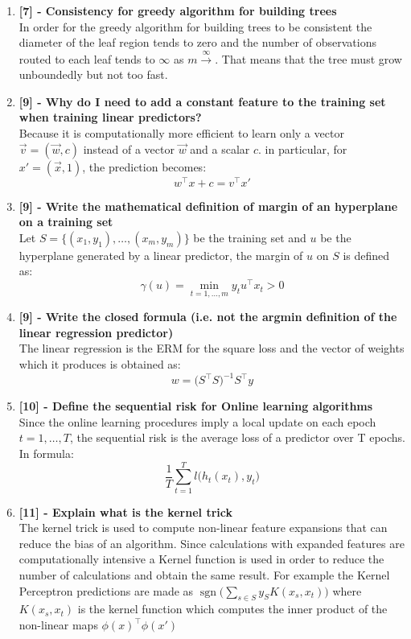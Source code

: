 \documentclass[a4paper]{report}
\begin{document}
\begin{enumerate}
    \item \textbf{[7] - Consistency for greedy algorithm for building trees}\\
    In order for the greedy algorithm for building trees to be consistent the diameter of the leaf region tends to zero and the number of observations routed to each leaf tends to $\infty$ as $m \xrightarrow{\infty}$. That means that the tree must grow unboundedly but not too fast.
    \item \textbf{[9] - Why do I need to add a constant feature to the training set when training linear predictors?}\\
    Because it is computationally more efficient to learn only a vector $\vec{v} = (\vec{w},  c)$ instead of a vector $\vec{w}$ and a scalar $c$. in particular, for $x' = (\vec{x}, 1)$, the prediction becomes: \[w^\top x + c = v^\top x'\]
    \item \textbf{[9] - Write the mathematical definition of margin of an hyperplane on a training set}\\
    Let $S = \{(x_1 , y_1),\dots,(x_m , y_m)\}$ be the training set and $u$ be the hyperplane generated by a linear predictor, the margin of $u$ on $S$ is defined as:
    \[\gamma(u) = \min_{t = 1,\dots ,m}y_t u^\top x_t > 0\]
    \item \textbf{[9] - Write the closed formula (i.e. not the argmin definition of the linear regression predictor)}\\
    The linear regression is the ERM for the square loss and the vector of weights which it produces is obtained as: \[w = \big(S^\top S\big)^{-1} S^\top y\]
    \item \textbf{[10] - Define the sequential risk for Online learning algorithms}\\
    Since the online learning procedures imply a local update on each epoch $t = 1, \dots, T$, the sequential risk is the average loss of a predictor over T epochs. In formula:
    \[\frac{1}{T}\sum_{t=1}^{T}l\big(h_t (x_t), y_t\big)\]
    \item \textbf{[11] - Explain what is the kernel trick}\\
    The kernel trick is used to compute non-linear feature expansions that can reduce the bias of an algorithm.
    Since calculations with expanded features are computationally intensive a Kernel function is used in order to reduce the number of calculations and obtain the same result.
    For example the Kernel Perceptron predictions are made as $\operatorname{sgn} \big( \sum_{s \in S} y_S K(x_s, x_t)\big)$ where $K(x_s, x_t)$ is the kernel function which computes the inner product of the non-linear maps $\phi(x)^\top \phi(x')$

\end{enumerate}
\end{document}
